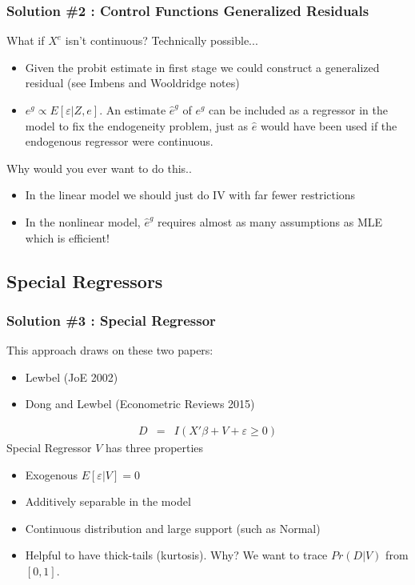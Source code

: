 \begin{frame}
\frametitle{Solution \#2 : Control Functions Generalized Residuals}
What if $X^e$ isn't continuous? Technically possible...
\begin{itemize}
\item Given the probit estimate in first stage we could construct a generalized residual (see Imbens and Wooldridge notes) 
\item $e^g \propto E[\varepsilon | Z, e]$. An estimate $\hat{e}^g$ of $e^g$ can be included as a regressor in the model to fix the endogeneity problem, just as $\hat{e}$ would have been used if the endogenous regressor were continuous.
\end{itemize}
Why would you ever want to do this..
\begin{itemize}
\item In the linear model we should just do IV with far fewer restrictions
\item In the nonlinear model, $\hat{e}^g$ requires almost as many assumptions as MLE which is efficient!
\end{itemize}
\end{frame}

\subsection{Special Regressors}
\begin{frame}
\frametitle{Solution \#3 : Special Regressor}
This approach draws on these two papers:
\begin{itemize}
\item Lewbel (JoE 2002)
\item Dong and Lewbel (Econometric Reviews 2015)
\end{itemize}
\begin{eqnarray*}
D &=& I ( X' \beta + V + \varepsilon \geq 0 )
\end{eqnarray*}
Special Regressor $V$ has three properties
\begin{itemize}
\item Exogenous $E[\varepsilon | V ] =0$
\item Additively separable in the model
\item Continuous distribution and large support (such as Normal)
\item Helpful to have thick-tails (kurtosis). Why? We want to trace $Pr(D | V)$ from $[0,1]$.
\end{itemize}
\end{frame}

